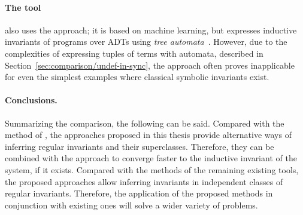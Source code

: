 \paragraph{The \rchc{} tool~\cite{haude2020,losekoot_et_al:LIPIcs.FSCD.2023.7}} also uses the \ice{} approach; it is based on machine learning, but expresses inductive invariants of programs over ADTs using \emph{tree automata}~\cite{tata}. However, due to the complexities of expressing tuples of terms with automata, described in Section~\ref{sec:comparison/undef-in-sync}, the approach often proves inapplicable for even the simplest examples where classical symbolic invariants exist.

\paragraph{Conclusions.} Summarizing the comparison, the following can be said. Compared with the method of \rchc{}, the approaches proposed in this thesis provide alternative ways of inferring regular invariants and their superclasses. Therefore, they can be combined with the \rchc{} approach to converge faster to the inductive invariant of the system, if it exists. Compared with the methods of the remaining existing tools, the proposed approaches allow inferring invariants in independent classes of regular invariants. Therefore, the application of the proposed methods in conjunction with existing ones will solve a wider variety of problems.

